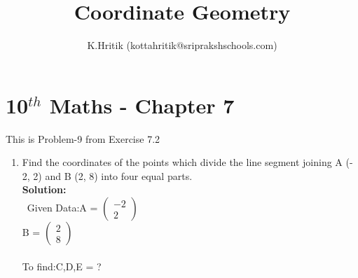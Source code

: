 \documentclass[10pt]{article}
\title{Coordinate Geometry}
\author{K.Hritik (kottahritik@sriprakshschools.com)}
\newcommand{\myvec}[1]{\ensuremath{\begin{pmatrix}#1\end{pmatrix}}}
\newcommand{\solution}{\noindent \textbf{Solution: }}
\begin{document}
\maketitle
\section*{10$^{th}$ Maths - Chapter 7}
This is Problem-9 from Exercise 7.2
\begin{enumerate}
\item Find the coordinates of the points which divide the line segment joining A (- 2, 2) and B (2, 8) into four equal parts.  \\
\solution \\
\
Given Data:A = \myvec{-2\\2}\\
           B = \myvec{2\\8}\\
\\To find:C,D,E = ?\\


\end{enumerate}
\end{document}
